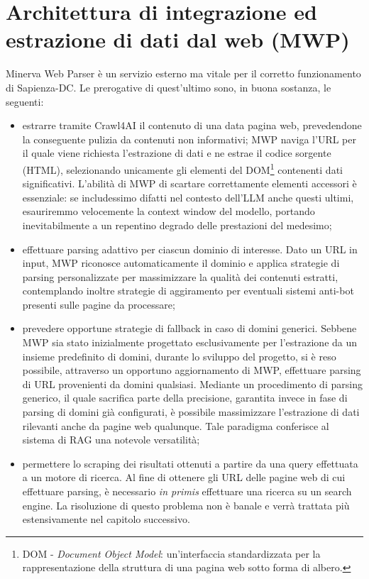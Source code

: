 \section{Architettura di integrazione ed estrazione di dati dal web (MWP)}
Minerva Web Parser è un servizio esterno ma vitale per il corretto funzionamento di Sapienza-DC. Le prerogative di quest'ultimo sono, in buona sostanza, le seguenti:
\begin{itemize}
    \item estrarre tramite Crawl4AI il contenuto di una data pagina web, prevedendone la conseguente pulizia da contenuti non informativi; MWP naviga l'URL per il quale viene richiesta l'estrazione di dati e ne estrae il codice sorgente (HTML), selezionando unicamente gli elementi del DOM\footnote{DOM - \textit{Document Object Model}: un'interfaccia standardizzata per la rappresentazione della struttura di una pagina web sotto forma di albero.} contenenti dati significativi. L'abilità di MWP di scartare correttamente elementi accessori è essenziale: se includessimo difatti nel contesto dell'LLM anche questi ultimi, esauriremmo velocemente la context window del modello, portando inevitabilmente a un repentino degrado delle prestazioni del medesimo;
    \item effettuare parsing adattivo per ciascun dominio di interesse. Dato un URL in input, MWP riconosce automaticamente il dominio e applica strategie di parsing personalizzate per massimizzare la qualità dei contenuti estratti, contemplando inoltre strategie di aggiramento per eventuali sistemi anti-bot presenti sulle pagine da processare;
    \item prevedere opportune strategie di fallback in caso di domini generici. Sebbene MWP sia stato inizialmente progettato esclusivamente per l'estrazione da un insieme predefinito di domini, durante lo sviluppo del progetto, si è reso possibile, attraverso un opportuno aggiornamento di MWP, effettuare parsing di URL provenienti da domini qualsiasi. Mediante un procedimento di parsing generico, il quale sacrifica parte della precisione, garantita invece in fase di parsing di domini già configurati, è possibile massimizzare l'estrazione di dati rilevanti anche da pagine web qualunque. Tale paradigma conferisce al sistema di RAG una notevole versatilità;
    \item permettere lo scraping dei risultati ottenuti a partire da una query effettuata a un motore di ricerca. Al fine di ottenere gli URL delle pagine web di cui effettuare parsing, è necessario \textit{in primis} effettuare una ricerca su un search engine. La risoluzione di questo problema non è banale e verrà trattata più estensivamente nel capitolo successivo.        
\end{itemize}

